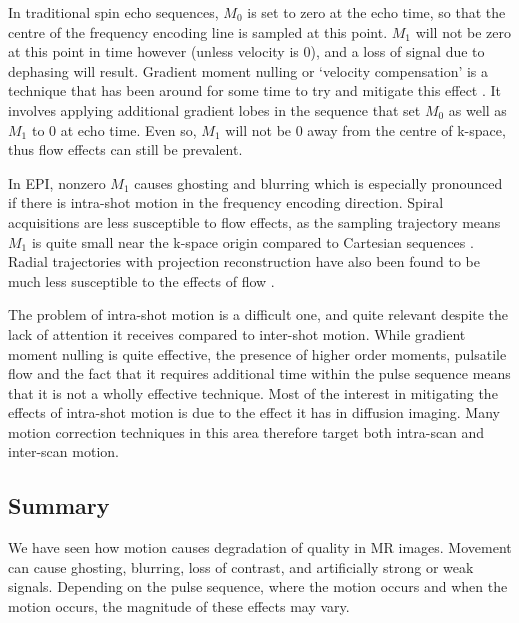 \documentclass[class=article, crop=false]{standalone}
\begin{document}
\par
In traditional spin echo sequences, $M_0$ is set to zero at the echo time, so that the centre of the frequency encoding line is sampled at this point. $M_1$ will not be zero at this point in time however (unless velocity is 0), and a loss of signal due to dephasing will result. Gradient moment nulling or `velocity compensation' is a technique that has been around for some time to try and mitigate this effect \parencite{Haacke1987}. It involves applying additional gradient lobes in the sequence that set $M_0$ as well as $M_1$ to $0$ at echo time. Even so, $M_1$ will not be $0$ away from the centre of k-space, thus flow effects can still be prevalent.
\par
In EPI, nonzero $M_1$ causes ghosting and blurring which is especially pronounced if there is intra-shot motion in the frequency encoding direction. Spiral acquisitions are less susceptible to flow effects, as the sampling trajectory means $M_1$ is quite small near the k-space origin compared to Cartesian sequences \parencite{Irarrazaval1999,Nishimura}. Radial trajectories with projection reconstruction have also been found to be much less susceptible to the effects of flow \parencite{Nishimura1991}.
\par
The problem of intra-shot motion is a difficult one, and quite relevant despite the lack of attention it receives compared to inter-shot motion. While gradient moment nulling is quite effective, the presence of higher order moments, pulsatile flow and the fact that it requires additional time within the pulse sequence means that it is not a wholly effective technique. Most of the interest in mitigating the effects of intra-shot motion is due to the effect it has in diffusion imaging. Many motion correction techniques in this area therefore target both intra-scan and inter-scan motion.

\subsection{Summary}
We have seen how motion causes degradation of quality in MR images. Movement can cause ghosting, blurring, loss of contrast, and artificially strong or weak signals. Depending on the pulse sequence, where the motion occurs and when the motion occurs, the magnitude of these effects may vary.
\end{document}
